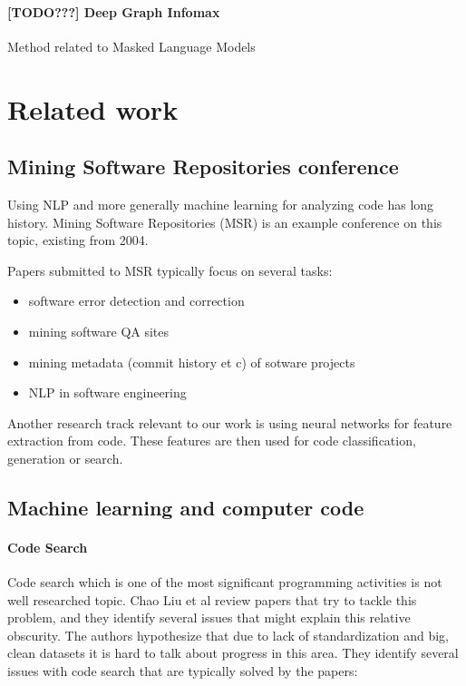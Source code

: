 \documentclass[11pt]{report}
\begin{document}
\subsubsection{[TODO???] Deep Graph Infomax}
Method related to Masked Language Models


\chapter{Related work}


\section{Mining Software Repositories conference}

Using NLP and more generally machine learning for analyzing code has long history. Mining Software Repositories (MSR) \cite{DBLP:conf/msr/2021} is an example conference on this topic, existing from 2004.

Papers submitted to MSR typically focus on several tasks:
\begin{itemize}
\item software error detection and correction
\item mining software QA sites
\item mining metadata (commit history et c) of sotware projects
\item NLP in software engineering
\end{itemize}

Another research track relevant to our work is using neural networks for feature extraction from code. These features are then used for code classification, generation or search.

\section{Machine learning and computer code}

\subsubsection{Code Search}
Code search which is one of the most significant programming activities is not well researched topic. Chao Liu et al \cite{code_search} review papers that try to tackle this problem, and they identify several issues that might explain this relative obscurity. The authors hypothesize that due to lack of standardization and big, clean datasets it is hard to talk about progress in this area. They identify several issues with code search that are typically solved by the papers:
\end{document}
